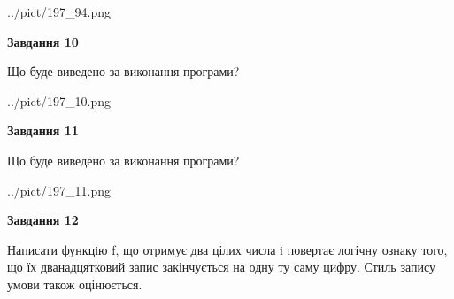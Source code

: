 \documentclass[12pt, ukrainian]{article}
\begin{document}
{\begin {large}
\begin{center}
	{../pict/197_94.png}
\end{center}
\newpage

{\begin {center}\textbf{Завдання 10}\end {center}}

Що буде виведено за виконання програми?\par
\begin{center}
	{../pict/197_10.png}
\end{center}
\newpage

{\begin {center}\textbf{Завдання 11}\end {center}}

Що буде виведено за виконання програми?\par
\begin{center}
	{../pict/197_11.png}
\end{center}
\newpage

{\begin {center}\textbf{Завдання 12}\end {center}}


Написати функцiю f, що отримує два цілих числа i повертає логічну ознаку того, що їх дванадцятковий запис закінчується на одну ту саму цифру. Стиль запису умови також оцінюється.\par
\newpage

\end {large}}
\end{document}
